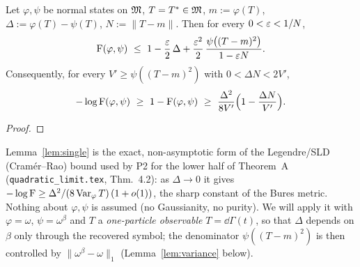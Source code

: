 \documentclass[11pt,a4paper]{article}
\begin{document}
\begin{lemma}\label{lem:single}
Let \(\varphi,\psi\) be normal states on \(\mathfrak M\), \(T=T^*\in\mathfrak M\), \(m:=\varphi(T)\),
\(\Delta:=\varphi(T)-\psi(T)\), \(N:=\|T-m\|\).  Then for every \(0<\varepsilon<1/N\),
\begin{equation}\label{eq:single}
 \Fid(\varphi,\psi)\ \le\ 1-\frac{\eps}{2}\,\Delta+\frac{\eps^2}{2}\,\frac{\psi\bigl((T-m)^2\bigr)}{1-\eps N}.
\end{equation}
Consequently, for every \(V'\ge\psi((T-m)^2)\) with \(0<\Delta N<2V'\),
\begin{equation}\label{eq:single2}
 -\log\Fid(\varphi,\psi)\ \ge\ 1-\Fid(\varphi,\psi)\ \ge\ \frac{\Delta^2}{8V'}\Bigl(1-\frac{\Delta N}{V'}\Bigr).
\end{equation}
\end{lemma}

\begin{proof}
\end{proof}

\begin{remark}
Lemma~\ref{lem:single} is the exact, non-asymptotic form of the Legendre/SLD (Cram\'er--Rao)
bound used by P2 for the lower half of Theorem~A (\texttt{quadratic\_limit.tex}, Thm.~4.2): as
\(\Delta\to0\) it gives \(-\log\operatorname{F}\ge\Delta^2/(8\operatorname{Var}_\varphi T)\,(1+o(1))\), the sharp constant of
the Bures metric.  Nothing about \(\varphi,\psi\) is assumed (no Gaussianity, no purity).  We
will apply it with \(\varphi=\omega\), \(\psi=\omega^\beta\) and \(T\) a \emph{one-particle
observable} \(T=\dd\Gamma(t)\), so that \(\Delta\) depends on \(\beta\) only through the recovered
symbol; the denominator \(\psi((T-m)^2)\) is then controlled by \(\|\omega^\beta-\omega\|_1\)
(Lemma~\ref{lem:variance} below).
\end{remark}
\end{document}
